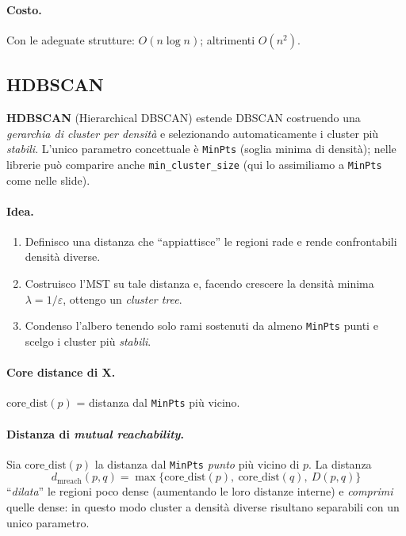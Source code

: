 \paragraph{Costo.}
Con le adeguate strutture: $O(n\log n)$; altrimenti $O(n^2)$.

\subsection{HDBSCAN}\label{sec:hdbscan}
\textbf{HDBSCAN} (Hierarchical DBSCAN) estende DBSCAN costruendo una \emph{gerarchia di cluster per densità} e selezionando
automaticamente i cluster più \emph{stabili}. L’unico parametro concettuale è \texttt{MinPts} (soglia minima di densità); nelle librerie può comparire anche \texttt{min\_cluster\_size} (qui lo assimiliamo a \texttt{MinPts} come nelle slide).

\paragraph{Idea.}
\begin{enumerate}
  \item Definisco una distanza che “appiattisce” le regioni rade e rende confrontabili densità diverse.
  \item Costruisco l’MST su tale distanza e, facendo crescere la densità minima \(\lambda=1/\varepsilon\), ottengo un \emph{cluster tree}.
  \item Condenso l’albero tenendo solo rami sostenuti da almeno \texttt{MinPts} punti e scelgo i cluster più \emph{stabili}. 
\end{enumerate}

\paragraph{Core distance di X.} \(\mathrm{core\_dist}(p)\) = distanza dal \texttt{MinPts} più vicino.

\paragraph{Distanza di \emph{mutual reachability}.}
Sia \(\mathrm{core\_dist}(p)\) la distanza dal \texttt{MinPts} \emph{punto} più vicino di \(p\). La distanza
\[
d_{\text{mreach}}(p,q)=\max\big\{\mathrm{core\_dist}(p),\ \mathrm{core\_dist}(q),\ D(p,q)\big\}
\]
“\emph{dilata}” le regioni poco dense (aumentando le loro distanze interne) e \emph{comprimi} quelle dense: in questo modo cluster a densità diverse risultano separabili con un unico parametro.

